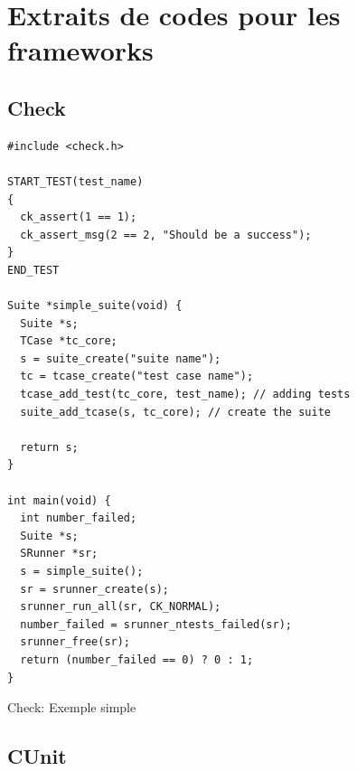 \documentclass[a4paper]{article}
\newcommand\StartAppendixEntries{}
\renewcommand\StartAppendixEntries{\value{tocdepth}=-10000\relax}%
\edef\maintocdepth{\the\value{tocdepth}}%
\renewcommand\StartAppendixEntries{\value{tocdepth}=\maintocdepth\relax}%
\newcommand*\appendixwithtoc{%
  \clearpage
  \appendix
  \addtocontents{toc}{\protect\StartAppendixEntries}
  \listofatoc
}
\begin{document}
\clearpage{}
\pagestyle{empty}
\printbibliography[keyword={paper},title={Bibliographie}]
\printbibliography[keyword={web},title={Webographie}]

\clearpage
\printglossaries

\appendixwithtoc

\clearpage{}
\section{Extraits de codes pour les frameworks}\label{appendix:frameworks-code}

\subsection*{Check}

\begin{listing}[ht!]
\begin{verbatim}
#include <check.h>

START_TEST(test_name)
{
  ck_assert(1 == 1);
  ck_assert_msg(2 == 2, "Should be a success");
}
END_TEST

Suite *simple_suite(void) {
  Suite *s;
  TCase *tc_core;
  s = suite_create("suite name");
  tc = tcase_create("test case name");
  tcase_add_test(tc_core, test_name); // adding tests
  suite_add_tcase(s, tc_core); // create the suite

  return s;
}

int main(void) {
  int number_failed;
  Suite *s;
  SRunner *sr;
  s = simple_suite();
  sr = srunner_create(s);
  srunner_run_all(sr, CK_NORMAL);
  number_failed = srunner_ntests_failed(sr);
  srunner_free(sr);
  return (number_failed == 0) ? 0 : 1;
}
\end{verbatim}
\caption{Check: Exemple simple}
\label{check-example}
\end{listing}

\clearpage{}
\subsection*{CUnit}
\end{document}
